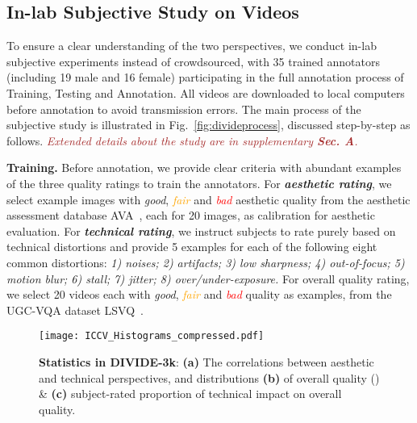 \documentclass[10pt,twocolumn,letterpaper]{article}
\renewcommand{\paragraph}[1]{\noindent \textbf{#1}}
\newcommand{\blue}[1]{\textbf{\textcolor{mblue}{#1}}}
\newcommand{\oorange}[1]{{\textcolor{orange}{#1}}}
\newcommand{\red}[1]{\textcolor{red}{#1}}
\newcommand{\green}[1]{\textcolor{mgreen}{#1}}
\begin{document}
\subsection{In-lab Subjective Study on Videos}
\label{sec:subprocess}
To ensure a clear understanding of the two perspectives, we conduct in-lab subjective experiments instead of crowdsourced, with 35 trained annotators (including 19 male and 16 female) participating in the full annotation process of Training, Testing and Annotation. All videos are downloaded to local computers before annotation to avoid transmission errors. The main process of the subjective study is illustrated in Fig.~\ref{fig:divideprocess}, discussed step-by-step as follows. \textcolor{brown}{\textit{Extended details about the study are in supplementary \textbf{Sec. A}.}}




\paragraph{Training.} Before annotation, we provide clear criteria with abundant examples of the three quality ratings to train the annotators. For \textbf{\textit{\blue{aesthetic rating}}}, we select example images with {\green{\textit{good}}}, {\oorange{\textit{fair}}} and {\red{\textit{bad}}} aesthetic quality from the aesthetic assessment database AVA~\cite{avaiaa}, each for 20 images, as calibration for aesthetic evaluation. For \textit{\textbf{\green{technical rating}}}, we instruct subjects to rate purely based on technical distortions and provide 5 examples for each of the following eight common distortions: \textit{1) noises; 2) artifacts; 3) low sharpness; 4) out-of-focus; 5) motion blur; 6) stall; 7) jitter; 8) over/under-exposure.} For overall quality rating, we select 20 videos each with {\green{\textit{good}}}, {\oorange{\textit{fair}}} and {\red{\textit{bad}}} quality as examples, from the UGC-VQA dataset LSVQ~\cite{pvq}. 



\begin{figure}
    \centering
    \texttt{[image: ICCV\_Histograms\_compressed.pdf]}
    \vspace{-16pt}
    \caption{\textbf{Statistics in DIVIDE-3k}: \textbf{(a)} The correlations between aesthetic and technical perspectives, and distributions \textbf{(b)} of overall quality () \& \textbf{(c)} subject-rated proportion of technical impact on overall quality.}
    \label{fig:histogram}
    \vspace{-10pt}
\end{figure}
\end{document}
